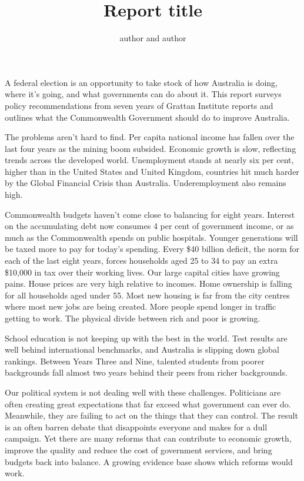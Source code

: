 \documentclass[continuous]{grattan}
\title{Report title}
\author{author and author}
\begin{document}
\layout
\contentspage

\listoffigures

\begin{overview} 
A federal election is an opportunity to take stock of how Australia
is doing, where it’s going, and what governments can do about it.
This report surveys policy recommendations from seven years of
Grattan Institute reports and outlines what the Commonwealth
Government should do to improve Australia.

The problems aren’t hard to find. Per capita national income has
fallen over the last four years as the mining boom subsided.
Economic growth is slow, reflecting trends across the developed
world. Unemployment stands at nearly six per cent, higher than in
the United States and United Kingdom, countries hit much harder
by the Global Financial Crisis than Australia. Underemployment
also remains high.

Commonwealth budgets haven’t come close to balancing for eight
years. Interest on the accumulating debt now consumes 4 per
cent of government income, or as much as the Commonwealth
spends on public hospitals. Younger generations will be taxed
more to pay for today’s spending. Every \$40 billion deficit, the
norm for each of the last eight years, forces households aged 25
to 34 to pay an extra \$10,000 in tax over their working lives.
Our large capital cities have growing pains. House prices are very
high relative to incomes. Home ownership is falling for all
households aged under 55. Most new housing is far from the city
centres where most new jobs are being created. More people
spend longer in traffic getting to work. The physical divide
between rich and poor is growing.

School education is not keeping up with the best in the world. Test
results are well behind international benchmarks, and Australia is
slipping down global rankings. Between Years Three and Nine,
talented students from poorer backgrounds fall almost two years
behind their peers from richer backgrounds.

Our political system is not dealing well with these challenges.
Politicians are often creating great expectations that far exceed
what government can ever do. Meanwhile, they are failing to act
on the things that they can control. The result is an often barren
debate that disappoints everyone and makes for a dull campaign.
Yet there are many reforms that can contribute to economic
growth, improve the quality and reduce the cost of government
services, and bring budgets back into balance. A growing
evidence base shows which reforms would work.


\end{overview}
\end{document}
